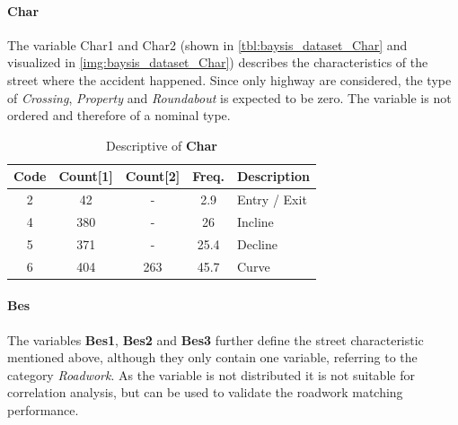 \paragraph{Char}
\label{baysis_dataset_Char}
The variable Char1 and Char2 (shown in \autoref{tbl:baysis_dataset_Char} and visualized in \ref{img:baysis_dataset_Char}) describes the characteristics of the street where the accident happened. Since only highway are considered, the type of \textit{Crossing}, \textit{Property} and \textit{Roundabout} is expected to be zero. The variable is not ordered and therefore of a nominal type.  
\begin{table}[ht]
	\centering
	\small
	\begin{tabular}{c|c|c|c|l}
		\toprule
		Code & Count[1] & Count[2] & Freq. & Description \\ 
		\midrule
	    2 & 42	& -		& 2.9	& Entry / Exit \\
	    4 & 380	& -		& 26	& Incline \\
	    5 & 371	& -		& 25.4	& Decline \\
	    6 & 404	& 263	& 45.7	& Curve \\
		\bottomrule
	\end{tabular}
	\caption{Descriptive of \textbf{Char}}
	\label{tbl:baysis_dataset_Char}
	\vspace{-8mm}
\end{table}
\paragraph{Bes}
\label{baysis_dataset_Bes}
The variables \textbf{Bes1}, \textbf{Bes2} and \textbf{Bes3} further define the street characteristic mentioned above, although they only contain one variable, referring to the category \textit{Roadwork}. As the variable is not distributed it is not suitable for correlation analysis, but can be used to validate the roadwork matching performance.

